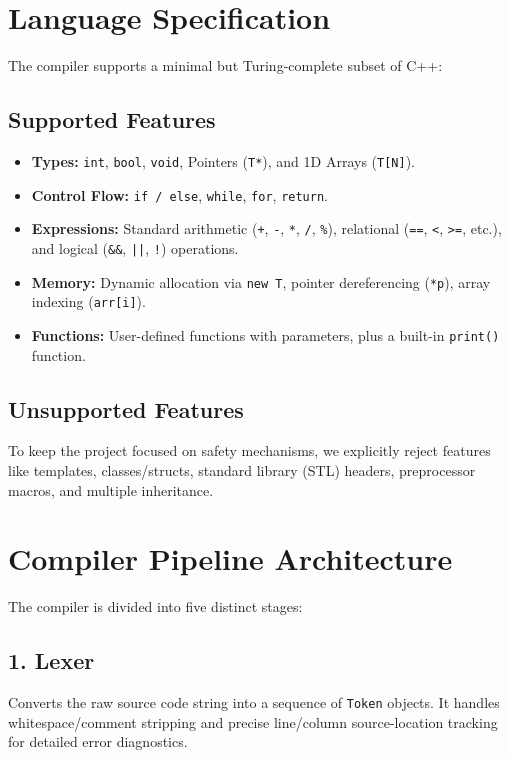 \documentclass[12pt, a4paper]{article}
\begin{document}
\section{Language Specification}
The compiler supports a minimal but Turing-complete subset of C++:

\subsection{Supported Features}
\begin{itemize}
    \item \textbf{Types:} \texttt{int}, \texttt{bool}, \texttt{void}, Pointers (\texttt{T*}), and 1D Arrays (\texttt{T[N]}).
    \item \textbf{Control Flow:} \texttt{if / else}, \texttt{while}, \texttt{for}, \texttt{return}.
    \item \textbf{Expressions:} Standard arithmetic (\texttt{+}, \texttt{-}, \texttt{*}, \texttt{/}, \texttt{\%}), relational (\texttt{==}, \texttt{<}, \texttt{>=}, etc.), and logical (\texttt{\&\&}, \texttt{||}, \texttt{!}) operations.
    \item \textbf{Memory:} Dynamic allocation via \texttt{new T}, pointer dereferencing (\texttt{*p}), array indexing (\texttt{arr[i]}).
    \item \textbf{Functions:} User-defined functions with parameters, plus a built-in \texttt{print()} function.
\end{itemize}

\subsection{Unsupported Features}
To keep the project focused on safety mechanisms, we explicitly reject features like templates, classes/structs, standard library (STL) headers, preprocessor macros, and multiple inheritance.

\section{Compiler Pipeline Architecture}
The compiler is divided into five distinct stages:

\subsection{1. Lexer}
Converts the raw source code string into a sequence of \texttt{Token} objects. It handles whitespace/comment stripping and precise line/column source-location tracking for detailed error diagnostics.
\end{document}
